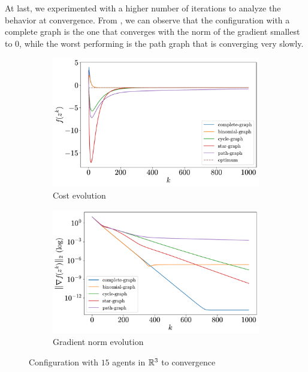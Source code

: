 \documentclass[a4paper,11pt,oneside]{book}
\begin{document}
At last, we experimented with a higher number of iterations to analyze the behavior at convergence. From , we can observe that the configuration with a complete graph is the one that converges with the norm of the gradient smallest to $0$, while the worst performing is the path graph that is converging very slowly.

\begin{figure}[H]
      \centering
      \begin{subfigure}[t]{0.49\textwidth}
            \centering
            \includegraphics[width=\linewidth]{./figs/quadratic/cost_15_3_1000.pdf} 
            \caption{Cost evolution}
      \end{subfigure}
      \hfill
      \begin{subfigure}[t]{0.49\textwidth}
            \centering
            \includegraphics[width=\linewidth]{./figs/quadratic/gradient_15_3_1000.pdf} 
            \caption{Gradient norm evolution}
      \end{subfigure}
      \caption{Configuration with $15$ agents in ${\mathbb{R}}^{3}$ to convergence}
      \label{fig:quadratic_15_3_1000}
\end{figure}
\end{document}
